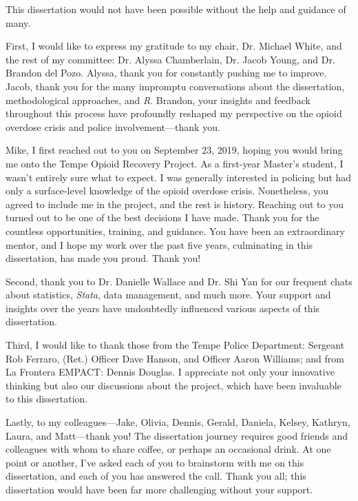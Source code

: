 This dissertation would not have been possible without the help and guidance of many.

First, I would like to express my gratitude to my chair, Dr. Michael White, and the rest of my committee: Dr. Alyssa Chamberlain, Dr. Jacob Young, and Dr. Brandon del Pozo. Alyssa, thank you for constantly pushing me to improve. Jacob, thank you for the many impromptu conversations about the dissertation, methodological approaches, and \textit{R}. Brandon, your insights and feedback throughout this process have profoundly reshaped my perspective on the opioid overdose crisis and police involvement—thank you.

Mike, I first reached out to you on September 23, 2019, hoping you would bring me onto the Tempe Opioid Recovery Project. As a first-year Master's student, I wasn’t entirely sure what to expect. I was generally interested in policing but had only a surface-level knowledge of the opioid overdose crisis. Nonetheless, you agreed to include me in the project, and the rest is history. Reaching out to you turned out to be one of the best decisions I have made. Thank you for the countless opportunities, training, and guidance. You have been an extraordinary mentor, and I hope my work over the past five years, culminating in this dissertation, has made you proud. Thank you!

Second, thank you to Dr. Danielle Wallace and Dr. Shi Yan for our frequent chats about statistics, \textit{Stata}, data management, and much more. Your support and insights over the years have undoubtedly influenced various aspects of this dissertation.

Third, I would like to thank those from the Tempe Police Department: Sergeant Rob Ferraro, (Ret.) Officer Dave Hanson, and Officer Aaron Williams; and from La Frontera EMPACT: Dennis Douglas. I appreciate not only your innovative thinking but also our discussions about the project, which have been invaluable to this dissertation.

Lastly, to my colleagues—Jake, Olivia, Dennis, Gerald, Daniela, Kelsey, Kathryn, Laura, and Matt—thank you! The dissertation journey requires good friends and colleagues with whom to share coffee, or perhaps an occasional drink. At one point or another, I’ve asked each of you to brainstorm with me on this dissertation, and each of you has answered the call. Thank you all; this dissertation would have been far more challenging without your support.